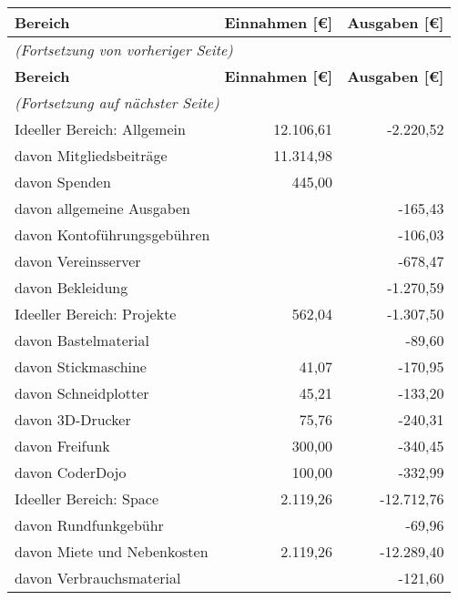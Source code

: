 \documentclass[parskip=half-]{s0minutes}
\begin{document}
\begin{longtable}{|l|r|r|}
  \hline
  \textbf{Bereich} & \textbf{Einnahmen [€]} & \textbf{Ausgaben [€]} \\
  \hline
  \endfirsthead
  \multicolumn{3}{l}{\emph{(Fortsetzung von vorheriger Seite)}} \\
  \hline
  \textbf{Bereich} & \textbf{Einnahmen [€]} & \textbf{Ausgaben [€]} \\
  \hline
  \endhead
  \multicolumn{3}{l}{\emph{(Fortsetzung auf nächster Seite)}} \\
  \endfoot
  \endlastfoot
  Ideeller Bereich: Allgemein       & 12{.}106{,}61 &  -2{.}220{,}52 \\
  \quad davon Mitgliedsbeiträge     & 11{.}314{,}98 &                \\
  \quad davon Spenden               &      445{,}00 &                \\
	\quad davon allgemeine Ausgaben   &               &      -165{,}43 \\
  \quad davon Kontoführungsgebühren &               &      -106{,}03 \\
  \quad davon Vereinsserver         &               &      -678{,}47 \\
	\quad davon Bekleidung            &               &  -1{.}270{,}59 \\
  \hline
  Ideeller Bereich: Projekte        &      562{,}04 &  -1{.}307{,}50 \\
  \quad davon Bastelmaterial        &               &       -89{,}60 \\
  \quad davon Stickmaschine         &       41{,}07 &      -170{,}95 \\
  \quad davon Schneidplotter        &       45{,}21 &      -133{,}20 \\
  \quad davon 3D-Drucker            &       75{,}76 &      -240{,}31 \\
  \quad davon Freifunk              &      300{,}00 &      -340{,}45 \\
	\quad davon CoderDojo             &      100{,}00 &      -332{,}99 \\
  \hline
	Ideeller Bereich: Space           &  2{.}119{,}26 & -12{.}712{,}76 \\
  \quad davon Rundfunkgebühr        &               &       -69{,}96 \\
	\quad davon Miete und Nebenkosten &  2{.}119{,}26 & -12{.}289{,}40 \\
  \quad davon Verbrauchsmaterial    &               &      -121{,}60 \\

\end{longtable}
\end{document}
